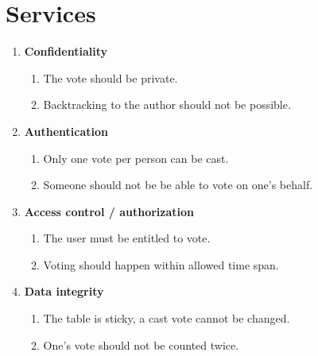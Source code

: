 \section{Services}
\label{sec:services}
\begin{enumerate}
    \item \textbf{Confidentiality}
    \begin{enumerate}
        \item The vote should be private.
        \item Backtracking to the author should not be possible.
    \end{enumerate}
    
    \item \textbf{Authentication}
    \begin{enumerate}
        \item Only one vote per person can be cast.
        \item Someone should not be be able to vote on one's behalf.
    \end{enumerate}
    
    \item \textbf{Access control / authorization}
    \begin{enumerate}
        \item The user must be entitled to vote.
        \item Voting should happen within allowed time span.
    \end{enumerate}
    
    \item \textbf{Data integrity}
    \begin{enumerate}
        \item The table is sticky, a cast vote cannot be changed.
        \item One's vote should not be counted twice.
    \end{enumerate}
    

\end{enumerate}
